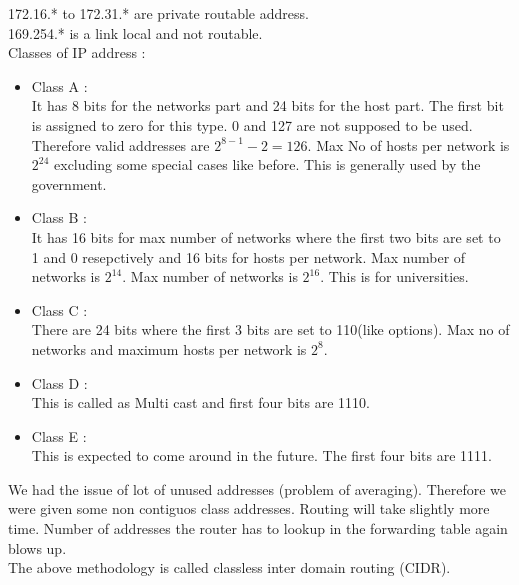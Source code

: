 \documentclass[solution,addpoints,12pt]{exam}
\begin{document}
172.16.* to 172.31.* are private routable address.\\
169.254.* is a link local and not routable.\\
Classes of IP address :\\
\begin{itemize}
\item Class A :\\
It has 8 bits for the networks part and 24 bits for the host part.
The first bit is assigned to zero for this type. 0 and
127 are not supposed to be used. Therefore valid addresses are
$2^{8-1} - 2 = 126$. Max No of hosts per network is $2^{24}$
excluding some special cases like before. This is generally used
by the government.
\item Class B :\\
It has 16 bits for max number of networks where
the first two bits are set to 1 and 0 resepctively and 16 bits
for hosts per network. Max number of networks is $2^{14}$.
Max number of networks is $2^{16}$. This is for universities.
\item Class C :\\
There are 24 bits where the first 3 bits are set to 110(like options).
Max no of networks and maximum hosts per network
is $2^{8}$.
\item Class D :\\
This is called as Multi cast and first four bits are 1110.
\item Class E :\\
This is expected to come around in the future. The first four
bits are 1111.
\end{itemize}
We had the issue of lot of unused addresses (problem of averaging).
Therefore we were given some non contiguos class addresses.
Routing will take slightly more time. Number of addresses the router
has to lookup in the forwarding table again blows up.\\
The above methodology is called classless inter domain routing (CIDR).\\
\end{document}
